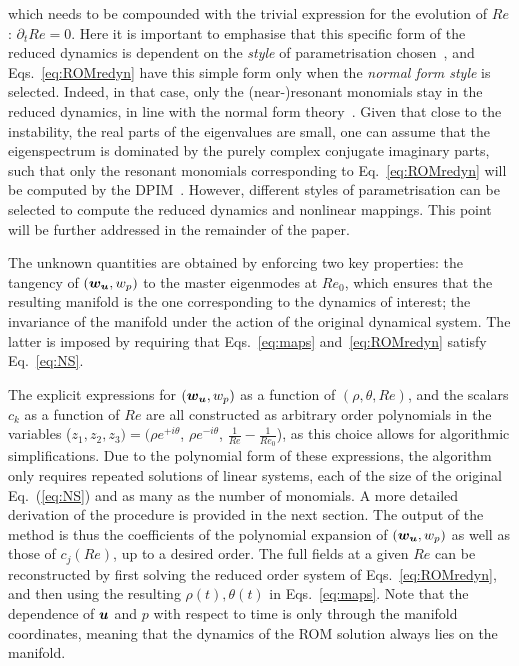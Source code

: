 \documentclass[%
reprint,
superscriptaddress,
 amsmath,amssymb,
 aps,
 pre
]{revtex4-2}
\newcommand{\alessio}[1]{\textcolor{cyan!80!black}{#1}}
\newcommand{\cyril}[1]{\textcolor{black!40!orange}{#1}}
\begin{document}
which needs to be compounded with the trivial expression for the evolution of $Re$: $\partial_t Re = 0$. Here it is important to emphasise that this specific form of the reduced dynamics is dependent on the \textit{style} of parametrisation chosen~\cite{Haro}, and Eqs.~\eqref{eq:ROMredyn} have this simple form only when the \textit{normal form style} is selected. Indeed, in that case, only the (near-)resonant monomials stay in the reduced dynamics, in line with the normal form theory~\cite{Murdock}. Given that close to the instability, the real parts of the eigenvalues are small, one can assume that the eigenspectrum is dominated by the purely complex conjugate imaginary parts, such that only the resonant monomials corresponding to Eq.~\eqref{eq:ROMredyn} will be computed by the DPIM~\cite{TouzeCISM,TouzeCISM2}. However, different styles of parametrisation can be selected to compute the reduced dynamics and nonlinear mappings. This point will be further addressed in the remainder of the paper.



The unknown quantities are obtained by enforcing two key properties: the tangency of $(\boldsymbol{w}_{\boldsymbol{u}},w_p)$ to the master eigenmodes at $Re_0$, which ensures that the resulting manifold is the one corresponding to the dynamics of interest; the invariance of the manifold under the action of the original dynamical system. The latter is imposed by requiring that Eqs.~\eqref{eq:maps} and~\eqref{eq:ROMredyn} satisfy Eq.~\eqref{eq:NS}. 


The explicit expressions for $(\boldsymbol{w}_{\boldsymbol{u}},w_p)$ as a function of $(\rho,\theta,Re)$, and the scalars $c_k$ as a function of $Re$ are all constructed as arbitrary order polynomials in the variables ($z_1,z_2,z_3)=(\rho e^{+i\theta}$, $\rho e^{-i\theta}$, $\frac{1}{Re}-\frac{1}{Re_0}$), as this choice allows for algorithmic simplifications. Due to the polynomial form of these expressions, the algorithm only requires repeated solutions of linear systems, each of the size of the original Eq.~(\ref{eq:NS}) and as many as the number of monomials. A more detailed derivation of the procedure is provided in the next section.
The output of the method is thus the coefficients of the polynomial expansion of $(\boldsymbol{w}_{{\boldsymbol{u}}},w_p)$ as well as those of $c_j(Re)$, up to a desired order. The full fields at a given $Re$ can be reconstructed by first solving the reduced order system of Eqs.~\eqref{eq:ROMredyn}, and then using the resulting $\rho (t),\theta (t)$ in Eqs.~\eqref{eq:maps}. Note that the dependence of ${\boldsymbol{u}}$ and $p$ with respect to time is only through the manifold coordinates, meaning that the dynamics of the ROM solution always lies on the manifold.
\end{document}
